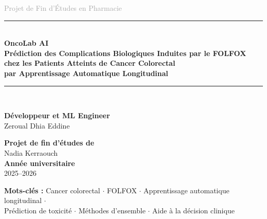 \documentclass[12pt,a4paper]{report}
\begin{document}
\begin{titlepage}
\centering
\vspace*{1cm}

{\large\textcolor{darkgray}{Projet de Fin d'Études en Pharmacie}}\\[1.5cm]

\rule{\linewidth}{1.5pt}\\[0.4cm]
{\Huge\bfseries\color{primaryblue}
  OncoLab AI\\[0.3cm]
  \large Prédiction des Complications Biologiques Induites par le FOLFOX\\
  chez les Patients Atteints de Cancer Colorectal\\
  par Apprentissage Automatique Longitudinal
}\\[0.4cm]
\rule{\linewidth}{1.5pt}\\[1.5cm]

\begin{minipage}{0.45\textwidth}
  \raggedright
  \textbf{Développeur et ML Engineer}\\
  Zeroual Dhia Eddine \\[0.4cm]
 
\end{minipage}
\hfill
\begin{minipage}{0.45\textwidth}
  \raggedleft
  \textbf{Projet de fin d'études de}\\
  Nadia Kerraouch\\[0.4cm]
  \textbf{Année universitaire}\\
  2025--2026\\
\end{minipage}

\vfill

\begin{infobox}
\centering
\textbf{Mots-clés :}
Cancer colorectal $\cdot$ FOLFOX $\cdot$ Apprentissage automatique longitudinal $\cdot$\\
Prédiction de toxicité $\cdot$ Méthodes d'ensemble $\cdot$ Aide à la décision clinique
\end{infobox}

\end{titlepage}

\end{document}
